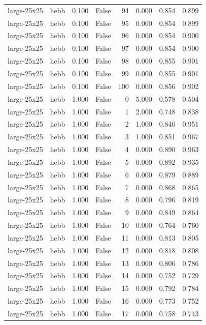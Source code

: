 \begin{tabular}{llrrrrrr}
large-25x25 & hebb & 0.100 & False & 94 & 0.000 & 0.854 & 0.899 \\
large-25x25 & hebb & 0.100 & False & 95 & 0.000 & 0.854 & 0.899 \\
large-25x25 & hebb & 0.100 & False & 96 & 0.000 & 0.854 & 0.900 \\
large-25x25 & hebb & 0.100 & False & 97 & 0.000 & 0.854 & 0.900 \\
large-25x25 & hebb & 0.100 & False & 98 & 0.000 & 0.855 & 0.901 \\
large-25x25 & hebb & 0.100 & False & 99 & 0.000 & 0.855 & 0.901 \\
large-25x25 & hebb & 0.100 & False & 100 & 0.000 & 0.856 & 0.902 \\
large-25x25 & hebb & 1.000 & False & 0 & 5.000 & 0.578 & 0.504 \\
large-25x25 & hebb & 1.000 & False & 1 & 2.000 & 0.748 & 0.838 \\
large-25x25 & hebb & 1.000 & False & 2 & 1.000 & 0.846 & 0.951 \\
large-25x25 & hebb & 1.000 & False & 3 & 1.000 & 0.851 & 0.967 \\
large-25x25 & hebb & 1.000 & False & 4 & 0.000 & 0.890 & 0.963 \\
large-25x25 & hebb & 1.000 & False & 5 & 0.000 & 0.892 & 0.935 \\
large-25x25 & hebb & 1.000 & False & 6 & 0.000 & 0.879 & 0.889 \\
large-25x25 & hebb & 1.000 & False & 7 & 0.000 & 0.868 & 0.865 \\
large-25x25 & hebb & 1.000 & False & 8 & 0.000 & 0.796 & 0.819 \\
large-25x25 & hebb & 1.000 & False & 9 & 0.000 & 0.849 & 0.864 \\
large-25x25 & hebb & 1.000 & False & 10 & 0.000 & 0.764 & 0.760 \\
large-25x25 & hebb & 1.000 & False & 11 & 0.000 & 0.813 & 0.805 \\
large-25x25 & hebb & 1.000 & False & 12 & 0.000 & 0.818 & 0.808 \\
large-25x25 & hebb & 1.000 & False & 13 & 0.000 & 0.806 & 0.786 \\
large-25x25 & hebb & 1.000 & False & 14 & 0.000 & 0.752 & 0.729 \\
large-25x25 & hebb & 1.000 & False & 15 & 0.000 & 0.792 & 0.784 \\
large-25x25 & hebb & 1.000 & False & 16 & 0.000 & 0.773 & 0.752 \\
large-25x25 & hebb & 1.000 & False & 17 & 0.000 & 0.758 & 0.743 \\

\end{tabular}
